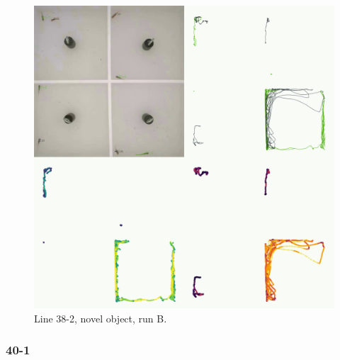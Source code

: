 \documentclass[
]{book}
\begin{document}
\begin{figure}
\includegraphics[width=1\linewidth]{figs/mikk_behaviour/four_panel_plots/novel_object_20191116_1309_21-2_R_B_300} \caption{Line 38-2, novel object, run B.}\label{fig:4p-21-2-no-B}
\end{figure}

\hypertarget{section-11}{%
\subsubsection{40-1}\label{section-11}}
\end{document}
